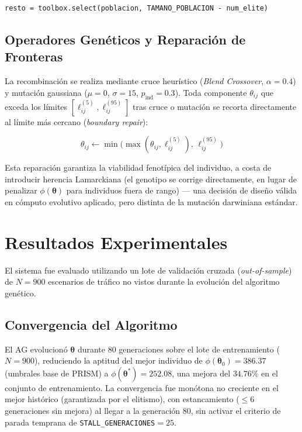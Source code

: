 \documentclass[12pt,a4paper]{article}
\begin{document}
\begin{verbatim}
resto = toolbox.select(poblacion, TAMANO_POBLACION - num_elite)
\end{verbatim}

\subsection{Operadores Genéticos y Reparación de Fronteras}

La recombinación se realiza mediante cruce heurístico (\textit{Blend
Crossover}, $\alpha=0.4$) y mutación gaussiana ($\mu=0$, $\sigma=15$,
$p_{\text{ind}}=0.3$). Toda componente $\theta_{ij}$ que exceda los
límites $[\ell_{ij}^{(5)}, \ell_{ij}^{(95)}]$ tras cruce o mutación se
recorta directamente al límite más cercano (\textit{boundary repair}):

\begin{equation}
\theta_{ij} \leftarrow \min\big(\max(\theta_{ij}, \ell_{ij}^{(5)}),\, \ell_{ij}^{(95)}\big)
\end{equation}

Esta reparación garantiza la viabilidad fenotípica del individuo, a
costa de introducir herencia Lamarckiana (el genotipo se corrige
directamente, en lugar de penalizar $\phi(\boldsymbol{\theta})$ para
individuos fuera de rango) — una decisión de diseño válida en cómputo
evolutivo aplicado, pero distinta de la mutación darwiniana estándar.


\section{Resultados Experimentales}

El sistema fue evaluado utilizando un lote de validación cruzada
(\textit{out-of-sample}) de $N=900$ escenarios de tráfico no vistos
durante la evolución del algoritmo genético.

\subsection{Convergencia del Algoritmo}

El AG evolucionó $\boldsymbol{\theta}$ durante 80 generaciones sobre el
lote de entrenamiento ($N=900$), reduciendo la aptitud del mejor
individuo de $\phi(\boldsymbol{\theta}_0)=386.37$ (umbrales base de
PRISM) a $\phi(\boldsymbol{\theta}^{*})=252.08$, una mejora del
$34.76\%$ en el conjunto de entrenamiento. La convergencia fue
monótona no creciente en el mejor histórico (garantizada por el
elitismo), con estancamiento ($\le 6$ generaciones sin mejora) al
llegar a la generación 80, sin activar el criterio de parada temprana
de \texttt{STALL\_GENERACIONES}$=25$.
\end{document}

